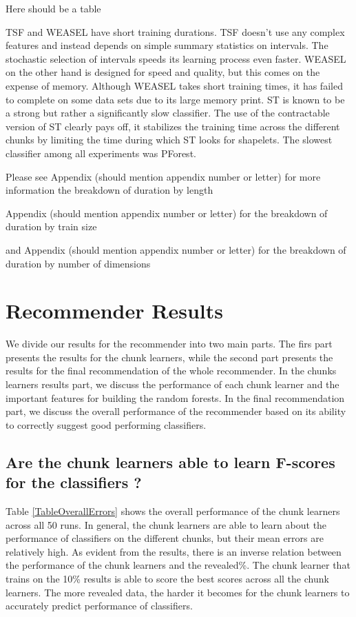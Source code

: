 Here should be a table

TSF and WEASEL have short training durations. TSF doesn't use any complex features and instead depends on simple summary statistics on intervals.
The stochastic selection of intervals speeds its learning process even faster.
WEASEL on the other hand is designed for speed and quality, but this comes on the expense of memory.
Although WEASEL takes short training times, it has failed to complete on some data sets due to its large memory print.
ST is known to be a strong but rather a significantly slow classifier.
The use of the contractable version of ST clearly pays off, it stabilizes the training time across the different chunks by limiting the time during which ST looks for shapelets.
The slowest classifier among all experiments was PForest. 

Please see Appendix (should mention appendix number or letter) for more information the breakdown of duration by length

Appendix (should mention appendix number or letter) for the breakdown of duration by train size

and Appendix (should mention appendix number or letter) for the breakdown of duration by number of dimensions

\section{Recommender Results}
\label{SectionRecommenderResults}
We divide our results for the recommender into two main parts. The firs part presents the results for the chunk learners, while the second part presents the results for the final recommendation of the whole recommender.
In the chunks learners results part, we discuss the performance of each chunk learner and the important features for building the random forests.
In the final recommendation part, we discuss the overall performance of the recommender based on its ability to correctly suggest good performing classifiers.

\subsection{Are the chunk learners able to learn F-scores for the classifiers ?}
\label{SubsectionFScoreResults}
Table \ref{TableOverallErrors} shows the overall performance of the chunk learners across all 50 runs.
In general, the chunk learners are able to learn about the performance of classifiers on the different chunks, but their mean errors are relatively high.
As evident from the results, there is an inverse relation between the performance of the chunk learners and the revealed\%.
The chunk learner that trains on the 10\% results is able to score the best scores across all the chunk learners.
The more revealed data, the harder it becomes for the chunk learners to accurately predict performance of classifiers.

